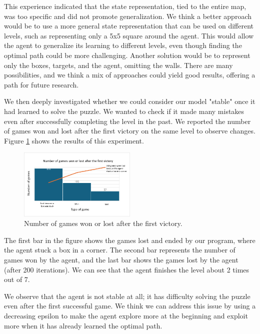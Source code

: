 \documentclass[10pt,twocolumn]{article}
\begin{document}
This experience indicated that the state representation, tied to the entire map, was too specific and did not promote generalization. We think a better approach would be to use a more general state representation that can be used on different levels, such as representing only a 5x5 square around the agent. This would allow the agent to generalize its learning to different levels, even though finding the optimal path could be more challenging. Another solution would be to represent only the boxes, targets, and the agent, omitting the walls. There are many possibilities, and we think a mix of approaches could yield good results, offering a path for future research.

We then deeply investigated whether we could consider our model "stable" once it had learned to solve the puzzle. We wanted to check if it made many mistakes even after successfully completing the level in the past. We reported the number of games won and lost after the first victory on the same level to observe changes. Figure \ref{fig:number_of_game_won} shows the results of this experiment.

\begin{figure}[ht]
    \centering
    \includegraphics[width=0.5\textwidth]{Images/number_of_game_won.png}
    \caption{Number of games won or lost after the first victory.}
    \label{fig:number_of_game_won}
\end{figure}

The first bar in the figure shows the games lost and ended by our program, where the agent stuck a box in a corner. The second bar represents the number of games won by the agent, and the last bar shows the games lost by the agent (after 200 iterations). We can see that the agent finishes the level about 2 times out of 7.

We observe that the agent is not stable at all; it has difficulty solving the puzzle even after the first successful game. We think we can address this issue by using a decreasing epsilon to make the agent explore more at the beginning and exploit more when it has already learned the optimal path.
\end{document}
